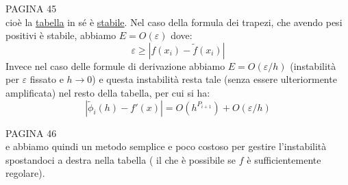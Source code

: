 \documentclass[12pt,a4paper]{article}
\begin{document}
PAGINA 45 %
\\
cioè la \underline{tabella} in sé è \underline{stabile}.
Nel caso della formula dei trapezi, che avendo pesi positivi è stabile, abbiamo $E=O(\varepsilon)$ dove:
\begin{equation*}
    \varepsilon \geq |f(x_i)-\tilde{f}(x_i)|
\end{equation*}
Invece nel caso delle formule di derivazione abbiamo $E=O(\varepsilon/h)$ (instabilità per $\varepsilon$ fissato e $h\rightarrow 0$) e questa instabilità resta tale (senza essere ulteriormente amplificata) nel resto della tabella, per cui si ha:
\begin{equation*}
    |\tilde{\phi}_i(h)-f'(x)|=O(h^{P_{i+1}})+O(\varepsilon/h)
\end{equation*}

PAGINA 46 %
\\
e abbiamo quindi un metodo semplice e poco costoso per gestire l'instabilità spostandoci a destra nella tabella ( il che è possibile se $f$ è sufficientemente regolare).
\end{document}
